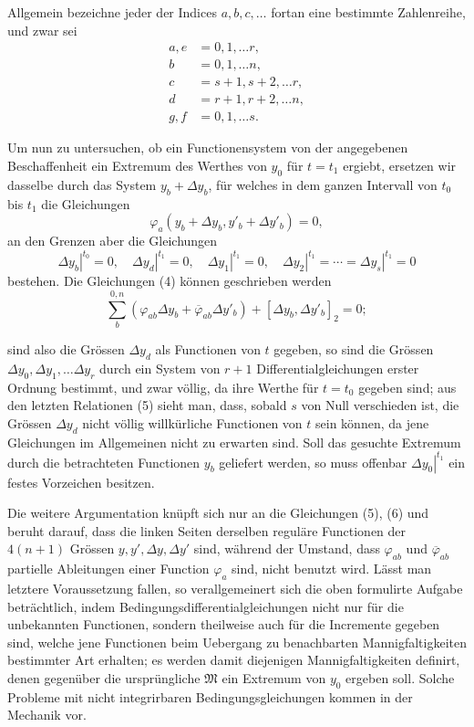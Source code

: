 \documentclass[11pt,a4paper,leqno]{article}
\begin{document}
Allgemein bezeichne jeder der Indices $a,b,c,\ldots$ fortan eine
bestimmte Zahlenreihe, und zwar sei
\[
\begin{aligned}
a,e&=0,1,\ldots r,\\
b&=0,1,\ldots n,\\
c&=s+1,s+2,\ldots r,\\
d&=r+1,r+2,\ldots n,\\
g,f&=0,1,\ldots s.
\end{aligned}
\]

Um nun zu untersuchen, ob ein Functionensystem von der angegebenen
Beschaffenheit ein Extremum des Werthes von $y_0$ für $t=t_1$ ergiebt,
ersetzen wir dasselbe durch das System $y_b+\Delta y_b$, für welches in
dem ganzen Intervall von $t_0$ bis $t_1$ die Gleichungen
\begin{equation}\tag{4}
\varphi_a(y_b+\Delta y_b,y'_b+\Delta y'_b)=0,
\end{equation}
an den Grenzen aber die Gleichungen
\begin{equation}\tag{5}
\left.\Delta y_b\right|^{t_0}=0,\quad
\left.\Delta y_d\right|^{t_1}=0,\quad
\left.\Delta y_1\right|^{t_1}=0,\quad
\left.\Delta y_2\right|^{t_1}=\cdots=
\left.\Delta y_s\right|^{t_1}=0
\end{equation}
bestehen. Die Gleichungen (4) können geschrieben werden
\begin{equation}\tag{6}
\sum_b^{0,n}\left(\varphi_{ab}\Delta y_b+
\overline{\varphi}_{ab}\Delta y'_b\right)
+[\Delta y_b,\Delta y'_b]_2=0;
\end{equation}

sind also die Grössen $\Delta y_d$ als Functionen von $t$ gegeben, so
sind die Grössen $\Delta y_0,\Delta y_1,\ldots\Delta y_r$ durch ein
System von $r+1$ Differentialgleichungen erster Ordnung bestimmt, und
zwar völlig, da ihre Werthe für $t=t_0$ gegeben sind; aus den letzten
Relationen (5) sieht man, dass, sobald $s$ von Null verschieden ist, die
Grössen $\Delta y_d$ nicht völlig willkürliche Functionen von $t$ sein
können, da jene Gleichungen im Allgemeinen nicht zu erwarten sind. Soll
das gesuchte Extremum durch die betrachteten Functionen $y_b$ geliefert
werden, so muss offenbar $\left.\Delta y_0\right|^{t_1}$ ein festes
Vorzeichen besitzen.

Die weitere Argumentation knüpft sich nur an die Gleichungen (5), (6)
und beruht darauf, dass die linken Seiten derselben reguläre Functionen
der $4(n+1)$ Grössen $y,y',\Delta y,\Delta y'$ sind, während der Umstand,
dass $\varphi_{ab}$ und $\overline{\varphi}_{ab}$ partielle Ableitungen
einer Function $\varphi_a$ sind, nicht benutzt wird. Lässt man letztere
Voraussetzung fallen, so verallgemeinert sich die oben formulirte
Aufgabe beträchtlich, indem Bedingungsdifferentialgleichungen nicht nur
für die unbekannten Functionen, sondern theilweise auch für die
Incremente gegeben sind, welche jene Functionen beim Uebergang zu
benachbarten Mannigfaltigkeiten bestimmter Art erhalten; es werden damit
diejenigen Mannigfaltigkeiten definirt, denen gegenüber die ursprüngliche
$\mathfrak M$ ein Extremum von $y_0$ ergeben soll. Solche Probleme mit
nicht integrirbaren Bedingungsgleichungen kommen in der Mechanik vor.
\end{document}
